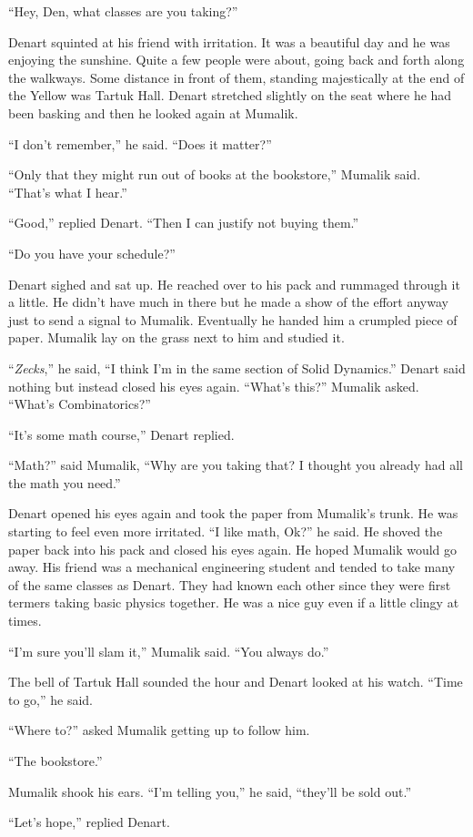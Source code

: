 
``Hey, Den, what classes are you taking?''

Denart squinted at his friend with irritation. It was a beautiful day and he was enjoying the
sunshine. Quite a few people were about, going back and forth along the walkways. Some distance
in front of them, standing majestically at the end of the Yellow was Tartuk Hall. Denart
stretched slightly on the seat where he had been basking and then he looked again at Mumalik.

``I don't remember,'' he said. ``Does it matter?''

``Only that they might run out of books at the bookstore,'' Mumalik said. ``That's what I
hear.''

``Good,'' replied Denart. ``Then I can justify not buying them.''

``Do you have your schedule?''

Denart sighed and sat up. He reached over to his pack and rummaged through it a little. He
didn't have much in there but he made a show of the effort anyway just to send a signal to
Mumalik. Eventually he handed him a crumpled piece of paper. Mumalik lay on the grass next to
him and studied it.

``\textit{Zecks},'' he said, ``I think I'm in the same section of Solid Dynamics.'' Denart said
nothing but instead closed his eyes again. ``What's this?'' Mumalik asked. ``What's
Combinatorics?''

``It's some math course,'' Denart replied.

``Math?'' said Mumalik, ``Why are you taking that? I thought you already had all the math you
need.''

Denart opened his eyes again and took the paper from Mumalik's trunk. He was starting to feel
even more irritated. ``I like math, Ok?'' he said. He shoved the paper back into his pack and
closed his eyes again. He hoped Mumalik would go away. His friend was a mechanical engineering
student and tended to take many of the same classes as Denart. They had known each other since
they were first termers taking basic physics together. He was a nice guy even if a little clingy
at times.

``I'm sure you'll slam it,'' Mumalik said. ``You always do.''

The bell of Tartuk Hall sounded the hour and Denart looked at his watch. ``Time to go,'' he
said.

``Where to?'' asked Mumalik getting up to follow him.

``The bookstore.''

Mumalik shook his ears. ``I'm telling you,'' he said, ``they'll be sold out.''

``Let's hope,'' replied Denart.
